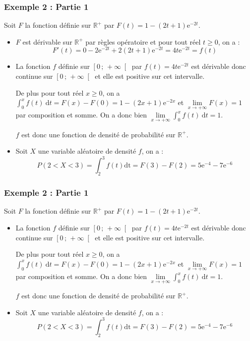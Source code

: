\documentclass[xcolor=svgnames,t,final]{beamer}
\newcommand{\R}{\mathbb{R}}
\newcommand{\Interfo}[2]{\left[#1\, ;\, #2\right[}
\newcommand{\limite}[2]{\lim\limits
_{x \to #1} #2}
\newcommand{\dt}{\ensuremath{\text{d}t}}		%
\newcommand{\integralet}[3]{\int_{#1}^{#2} #3 \ \dt}
\begin{document}
\begin{frame}

\frametitle{Exemple 2 : Partie 1}

 Soit $F$ la fonction définie sur $\R^{+}$ par $F(t)=1-(2t+1)\text{e}^{-2t}$.
 
\begin{itemize}
\pause \item $F$ est dérivable sur $\R^{+}$ par règles opératoire et pour tout réel $t \geqslant 0$, on a :
\begin{equation*}
F'(t)=0-2\text{e}^{-2t}+2(2t+1)\text{e}^{-2t}=4t\text{e}^{-2t}=f(t)
\end{equation*}

\pause \item La fonction  $f$ définie sur $\Interfo{0}{+\infty}$ par $f(t)=4t\text{e}^{-2t}$ est dérivable donc continue sur $\Interfo{0}{+\infty}$ et  elle est positive sur cet intervalle. 

De plus pour tout réel $x\geqslant 0$, on a $\integralet{0}{x}{f(t)}=F(x)-F(0)= 1-(2x+1)\text{e}^{-2x}$ et $\limite{+\infty}{F(x)}=1$ par composition et somme. On a donc bien $\lim\limits_{x\to +\infty}\integralet{0}{x}{f(t)}=1$.

$f$ est donc  une fonction de densité de probabilité sur $\R^{+}$.
\pause \item Soit $X$ une variable aléatoire de densité $f$, on a :
$$P\left(2<X<3\right)=\int_{2}^{3}f(t)\text{dt}=F(3)-F(2)=5\text{e}^{-4}-7\text{e}^{-6}$$
\end{itemize}


\end{frame}


\begin{frame}

\frametitle{Exemple 2 : Partie 1}

 Soit $F$ la fonction définie sur $\R^{+}$ par $F(t)=1-(2t+1)\text{e}^{-2t}$.
 
\begin{itemize}
\item La fonction  $f$ définie sur $\Interfo{0}{+\infty}$ par $f(t)=4t\text{e}^{-2t}$ est dérivable donc continue sur $\Interfo{0}{+\infty}$ et  elle est positive sur cet intervalle. 

De plus pour tout réel $x\geqslant 0$, on a $\integralet{0}{x}{f(t)}=F(x)-F(0)= 1-(2x+1)\text{e}^{-2x}$ et $\limite{+\infty}{F(x)}=1$ par composition et somme. On a donc bien $\lim\limits_{x\to +\infty}\integralet{0}{x}{f(t)}=1$.

$f$ est donc  une fonction de densité de probabilité sur $\R^{+}$.
\pause \item Soit $X$ une variable aléatoire de densité $f$, on a :
$$P\left(2<X<3\right)=\int_{2}^{3}f(t)\text{dt}=F(3)-F(2)=5\text{e}^{-4}-7\text{e}^{-6}$$
\end{itemize}


\end{frame}
\end{document}
